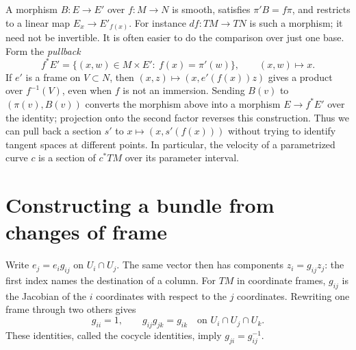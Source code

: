A morphism $B:E\to E'$ over $f:M\to N$ is smooth, satisfies $\pi'B=f\pi$, and restricts to a linear map $E_x\to E'_{f(x)}$. For instance $df:TM\to TN$ is such a morphism; it need not be invertible. It is often easier to do the comparison over just one base. Form the \emph{pullback}
\[
 f^*E'=\{(x,w)\in M\times E':\ f(x)=\pi'(w)\},\qquad (x,w)\longmapsto x .
\]
If $e'$ is a frame on $V\subset N$, then $(x,z)\mapsto(x,e'(f(x))z)$ gives a product over $f^{-1}(V)$, even when $f$ is not an immersion. Sending $B(v)$ to $(\pi(v),B(v))$ converts the morphism above into a morphism $E\to f^*E'$ over the identity; projection onto the second factor reverses this construction. Thus we can pull back a section $s'$ to $x\mapsto(x,s'(f(x)))$ without trying to identify tangent spaces at different points. In particular, the velocity of a parametrized curve $c$ is a section of $c^*TM$ over its parameter interval.

\section{Constructing a bundle from changes of frame}

Write $e_j=e_i g_{ij}$ on $U_i\cap U_j$. The same vector then has components $z_i=g_{ij}z_j$: the first index names the destination of a column. For $TM$ in coordinate frames, $g_{ij}$ is the Jacobian of the $i$ coordinates with respect to the $j$ coordinates. Rewriting one frame through two others gives
\begin{equation}
 g_{ii}=1,\qquad g_{ij}g_{jk}=g_{ik}\quad\text{on }U_i\cap U_j\cap U_k .
 \label{f:bundle-cocycle}
\end{equation}
These identities, called the cocycle identities, imply $g_{ji}=g_{ij}^{-1}$.


